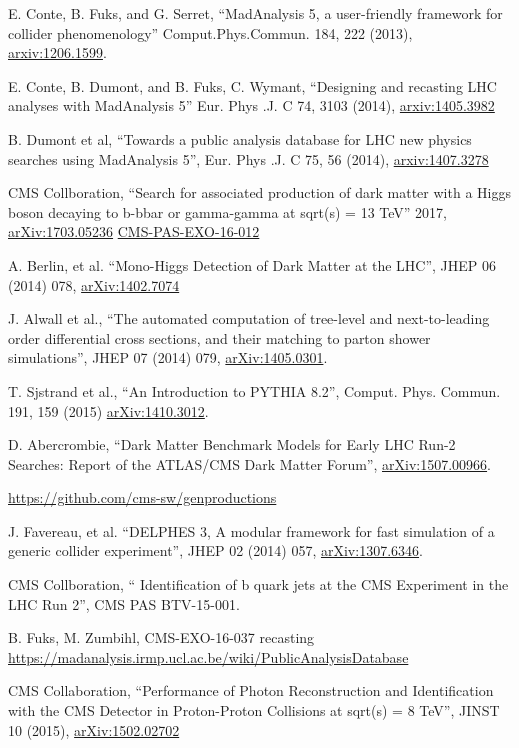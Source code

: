\documentclass[12pt,A4paper]{article}
\begin{document}
\clearpage

\begin{thebibliography}{5}\vspace{-7pt}

 E. Conte, B. Fuks, and G. Serret, ``MadAnalysis 5, a user-friendly framework for collider phenomenology'' Comput.Phys.Commun. 184, 222 (2013), \href{https://arxiv.org/abs/1206.1599}{arxiv:1206.1599}.

 E. Conte, B. Dumont, and B. Fuks, C. Wymant, ``Designing and recasting LHC analyses with MadAnalysis 5''
Eur. Phys .J. C 74, 3103 (2014), \href{https://arxiv.org/abs/1405.3982}{arxiv:1405.3982}

 B. Dumont et al, ``Towards a public analysis database for LHC new physics searches using MadAnalysis 5'', Eur. Phys .J. C 75, 56 (2014), \href{https://arxiv.org/abs/1407.3278}{arxiv:1407.3278}

 CMS Collboration, ``Search for associated production of dark matter with a Higgs boson decaying to b-bbar or gamma-gamma at sqrt(s) = 13 TeV'' 2017, \href{https://arxiv.org/abs/1703.05236}{arXiv:1703.05236} \href{http://cms-results.web.cern.ch/cms-results/public-results/publications/EXO-16-012/}{CMS-PAS-EXO-16-012}

 A. Berlin, et al. ``Mono-Higgs Detection of Dark Matter at the LHC'', JHEP 06 (2014) 078, \href{https://arxiv.org/abs/1402.7074}{arXiv:1402.7074}

 J. Alwall et al., ``The automated computation of tree-level and next-to-leading order differential cross sections, and their matching to parton shower simulations'', JHEP 07 (2014) 079, \href{https://arxiv.org/abs/1405.0301}{arXiv:1405.0301}.

 T. Sjstrand et al., ``An Introduction to PYTHIA 8.2'', Comput. Phys. Commun. 191, 159 (2015) \href{https://arxiv.org/abs/1410.3012}{arXiv:1410.3012}.

 D. Abercrombie, ``Dark Matter Benchmark Models for Early LHC Run-2 Searches: Report of the ATLAS/CMS Dark Matter Forum'', \href{https://arxiv.org/abs/1507.00966}{arXiv:1507.00966}.

 \url{https://github.com/cms-sw/genproductions}

 J. Favereau, et al. ``DELPHES 3, A modular framework for fast simulation of a generic collider experiment'', JHEP 02 (2014) 057, \href{https://arxiv.org/abs/1307.6346}{arXiv:1307.6346}.

 CMS Collboration, ``
Identification of b quark jets at the CMS Experiment in the LHC Run 2'', CMS PAS BTV-15-001.


 B. Fuks, M. Zumbihl, CMS-EXO-16-037 recasting \url{https://madanalysis.irmp.ucl.ac.be/wiki/PublicAnalysisDatabase}

 CMS Collaboration, ``Performance of Photon Reconstruction and Identification with the CMS Detector in Proton-Proton Collisions at sqrt(s) = 8 TeV'', JINST 10 (2015), \href{https://arxiv.org/abs/1502.02702}{arXiv:1502.02702}

\end{thebibliography}
\end{document}
